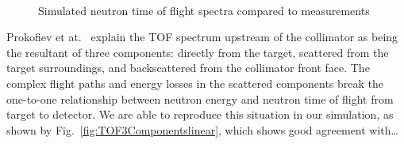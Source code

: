 \documentclass[11pt,a4paper]{IEEEtran}
\let\MYoriglatexcaption\caption
\renewcommand{\caption}[2][\relax]{\MYoriglatexcaption[#2]{#2}}
\begin{document}
\begin{figure}[!t]
	\centering
	\\
    \caption{Simulated neutron time of flight spectra compared to measurements}
    \label{fig:TOFSpectra}
\end{figure}

Prokofiev et at.~\cite{Prokofiev14} explain the TOF spectrum upstream of the collimator as being the resultant of three components: directly from the target, scattered from the target surroundings, and backscattered from the collimator front face.
The complex flight paths and energy losses in the scattered components break the one-to-one relationship between neutron energy and neutron time of flight from target to detector.
We are able to reproduce this situation in our simulation, as shown by Fig.~\ref{fig:TOF3Componentslinear}, which shows good agreement with\ldots{}
\end{document}
